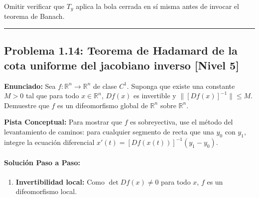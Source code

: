 \documentclass[11pt,a4paper]{article}
\begin{document}
\begin{trapbox}
Omitir verificar que $T_y$ aplica la bola cerrada en sí misma antes de invocar el teorema de Banach.
\end{trapbox}

\vspace{0.5cm}
\hrule
\vspace{0.5cm}

\subsection*{Problema 1.14: Teorema de Hadamard de la cota uniforme del jacobiano inverso \hfill \color{primaryblue}\small[Nivel 5]}

\begin{tcolorbox}[colback=white,colframe=gray!40,arc=1mm,boxrule=0.5pt,left=3mm,right=3mm,top=2mm,bottom=2mm]
\textbf{Enunciado:} Sea $f: \mathbb{R}^n \to \mathbb{R}^n$ de clase $C^1$. Suponga que existe una constante $M > 0$ tal que para todo $x \in \mathbb{R}^n$, $Df(x)$ es invertible y $\|[Df(x)]^{-1}\| \le M$. Demuestre que $f$ es un difeomorfismo global de $\mathbb{R}^n$ sobre $\mathbb{R}^n$.
\end{tcolorbox}

\begin{tcolorbox}[colback=yellow!4,colframe=accentamber!70,arc=1mm,boxrule=0.5pt,left=3mm,right=3mm,top=1.5mm,bottom=1.5mm]
\textbf{Pista Conceptual:} Para mostrar que $f$ es sobreyectiva, use el método del levantamiento de caminos: para cualquier segmento de recta que una $y_0$ con $y_1$, integre la ecuación diferencial $x'(t) = [Df(x(t))]^{-1}(y_1 - y_0)$.
\end{tcolorbox}

\paragraph{Solución Paso a Paso:}\par
\begin{enumerate}[label=\textbf{\arabic*.}]
\item \textbf{Invertibilidad local:}
Como $\det Df(x) \neq 0$ para todo $x$, $f$ es un difeomorfismo local.
\end{enumerate}
\end{document}
